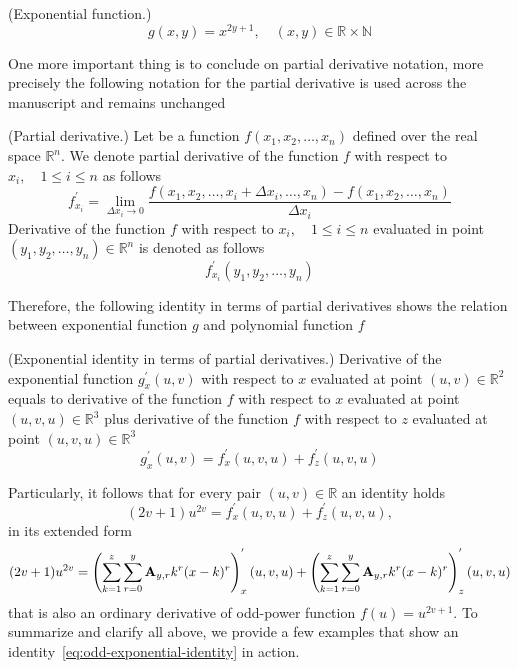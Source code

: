 \begin{definition}(Exponential function.)
    \begin{equation}
        g(x, y) = x^{2y + 1}, \quad (x,y) \in \mathbb{R}\times\mathbb{N}
        \label{eq:definition-g}
    \end{equation}
\end{definition}
One more important thing is to conclude on partial derivative notation,
more precisely the following notation for the partial derivative is used across the manuscript and remains unchanged
\begin{notation} (Partial derivative.)
    Let be a function $f(x_1, x_2, \dots, x_n)$ defined over the real space $\mathbb{R}^n$.
    We denote partial derivative of the function $f$ with respect to $x_i, \quad 1 \leq i \leq n$ as follows
    \begin{equation*}
        f^{'}_{x_i} = \lim_{\Delta x_i \to 0} \frac{f(x_1, x_2, \dots, x_i + \Delta x_i, \dots, x_n) - f(x_1, x_2, \dots, x_n)}{\Delta x_i}
    \end{equation*}
    Derivative of the function $f$ with respect to $x_i, \quad 1 \leq i \leq n$
    evaluated in point $(y_1, y_2, \dots, y_n) \in \mathbb{R}^n$ is denoted as follows
    \begin{equation*}
        f^{'}_{x_i} (y_1, y_2, \dots, y_n)
    \end{equation*}
\end{notation}
Therefore, the following identity in terms of partial derivatives shows the relation between exponential function $g$ and
polynomial function $f$
\begin{thm} (Exponential identity in terms of partial derivatives.)
    Derivative of the exponential function $g^{'}_{x} (u, v)$ with respect to $x$ evaluated at point $(u,v) \in \mathbb{R}^2$
    equals to derivative of the function $f$ with respect to $x$ evaluated at point $(u,v,u) \in \mathbb{R}^3$ plus
    derivative of the function $f$ with respect to $z$ evaluated at point $(u,v,u) \in \mathbb{R}^3$
    \begin{equation}
        g^{'}_{x} (u, v) = f^{'}_{x} (u, v, u) + f^{'}_{z} (u, v, u)
        \label{eq:odd-exponential-identity}
    \end{equation}
\end{thm}
Particularly, it follows that for every pair $(u,v) \in \mathbb{R}$ an identity holds
\begin{equation}
    \label{eq:equation}
    (2v+1)u^{2v} = f^{'}_{x} (u, v, u) + f^{'}_{z} (u, v, u),
\end{equation}
in its extended form
\begin{equation*}
(2v+1)u^{2v} =
\left(\sum_{k=1}^{z} \sum_{r=0}^{y} {\mathbf{A}} \sb{y,r} k^r (x-k)^r\right)^{'}_{x} (u, v, u) +
\left(\sum_{k=1}^{z} \sum_{r=0}^{y} {\mathbf{A}} \sb{y,r} k^r (x-k)^r\right)^{'}_{z} (u, v, u)
\end{equation*}
that is also an ordinary derivative of odd-power function $f(u)=u^{2v+1}$.
To summarize and clarify all above, we provide a few examples that show an identity~\eqref{eq:odd-exponential-identity}
in action.